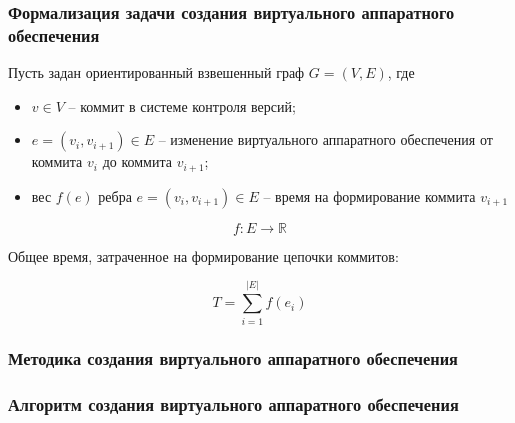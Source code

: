 \begin{frame}%
    \frametitle{Формализация задачи создания виртуального аппаратного обеспечения}
    Пусть задан ориентированный взвешенный граф $G = (V,E)$,
    где

    \begin{itemize}
        \item $v \in V$ -- коммит в системе контроля версий;
        \item $e=(v_i,v_{i+1}) \in E$ -- изменение виртуального
            аппаратного обеспечения от коммита $v_i$ до коммита $v_{i+1}$;
        \item вес $f(e)$ ребра $e=(v_i,v_{i+1}) \in E$ -- время на формирование коммита $v_{i+1}$
    \end{itemize}
    \begin{equation}
        f : E \rightarrow \mathbb{R}
    \end{equation}

    Общее время, затраченное на формирование цепочки коммитов:

    \begin{equation}
        T = \sum_{i=1}^{|E|} f(e_i)
    \end{equation}
\end{frame}


\begin{frame}%
    \frametitle{Методика создания виртуального аппаратного обеспечения}
    \begin{figure}[!htbp]
        \hspace*{-5cm}
        \scalebox{0.7}{
            
        }
    \end{figure}
\end{frame}


\begin{frame}%
    \frametitle{Алгоритм создания виртуального аппаратного обеспечения}
    \begin{figure}[!htbp]
        \hspace*{-5cm}
        \scalebox{0.56}{
            
        }
    \end{figure}
\end{frame}




